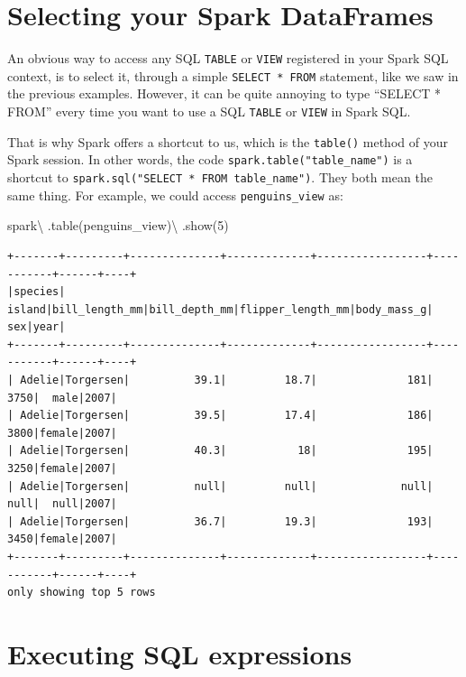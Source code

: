 \documentclass[
  11pt,
  letterpaper,
  DIV=11,
  numbers=noendperiod]{scrreprt}
\newenvironment{Shaded}{\begin{snugshade}}{\end{snugshade}}
\newcommand{\DecValTok}[1]{\textcolor[rgb]{0.68,0.00,0.00}{#1}}
\newcommand{\NormalTok}[1]{\textcolor[rgb]{0.00,0.23,0.31}{#1}}
\newcommand{\OperatorTok}[1]{\textcolor[rgb]{0.37,0.37,0.37}{#1}}
\newcommand{\StringTok}[1]{\textcolor[rgb]{0.13,0.47,0.30}{#1}}
\begin{document}
\hypertarget{selecting-your-spark-dataframes}{%
\section{Selecting your Spark
DataFrames}\label{selecting-your-spark-dataframes}}

An obvious way to access any SQL \texttt{TABLE} or \texttt{VIEW}
registered in your Spark SQL context, is to select it, through a simple
\texttt{SELECT\ *\ FROM} statement, like we saw in the previous
examples. However, it can be quite annoying to type ``SELECT * FROM''
every time you want to use a SQL \texttt{TABLE} or \texttt{VIEW} in
Spark SQL.

That is why Spark offers a shortcut to us, which is the \texttt{table()}
method of your Spark session. In other words, the code
\texttt{spark.table("table\_name")} is a shortcut to
\texttt{spark.sql("SELECT\ *\ FROM\ table\_name")}. They both mean the
same thing. For example, we could access \texttt{penguins\_view} as:

\begin{Shaded}
\begin{Highlighting}[]
\NormalTok{spark}\OperatorTok{\textbackslash{}}
\NormalTok{  .table(}\StringTok{\textquotesingle{}penguins\_view\textquotesingle{}}\NormalTok{)}\OperatorTok{\textbackslash{}}
\NormalTok{  .show(}\DecValTok{5}\NormalTok{)}
\end{Highlighting}
\end{Shaded}

\begin{verbatim}
+-------+---------+--------------+-------------+-----------------+-----------+------+----+
|species|   island|bill_length_mm|bill_depth_mm|flipper_length_mm|body_mass_g|   sex|year|
+-------+---------+--------------+-------------+-----------------+-----------+------+----+
| Adelie|Torgersen|          39.1|         18.7|              181|       3750|  male|2007|
| Adelie|Torgersen|          39.5|         17.4|              186|       3800|female|2007|
| Adelie|Torgersen|          40.3|           18|              195|       3250|female|2007|
| Adelie|Torgersen|          null|         null|             null|       null|  null|2007|
| Adelie|Torgersen|          36.7|         19.3|              193|       3450|female|2007|
+-------+---------+--------------+-------------+-----------------+-----------+------+----+
only showing top 5 rows
\end{verbatim}

\hypertarget{executing-sql-expressions}{%
\section{Executing SQL expressions}\label{executing-sql-expressions}}
\end{document}
